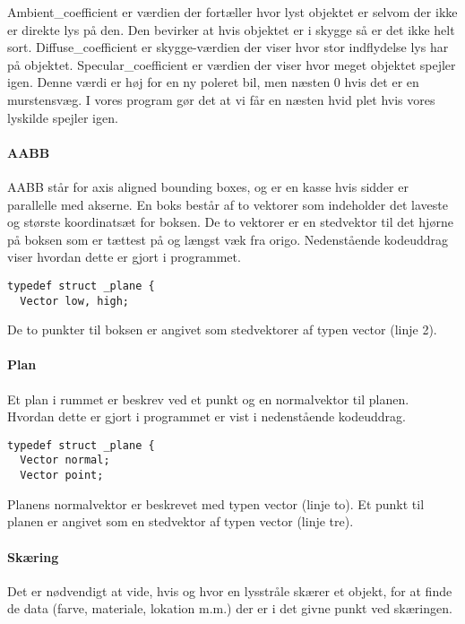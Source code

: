 Ambient\_coefficient er værdien der fortæller hvor lyst objektet er selvom der ikke er direkte lys på den. Den bevirker at hvis objektet er i skygge så er det ikke helt sort.
Diffuse\_coefficient er skygge-værdien der viser hvor stor indflydelse lys har på objektet. 
Specular\_coefficient er værdien der viser hvor meget objektet spejler igen. Denne værdi er høj for en ny poleret bil, men næsten 0 hvis det er en murstensvæg. I vores program gør det at vi får en næsten hvid plet hvis vores lyskilde spejler igen.

\paragraph{AABB}
AABB står for axis aligned bounding boxes, og er en kasse hvis sidder er parallelle med akserne. En boks består af to vektorer som indeholder det laveste og største koordinatsæt for boksen. De to vektorer er en stedvektor til det hjørne på boksen som er tættest på og længst væk fra origo. Nedenstående kodeuddrag viser hvordan dette er gjort i programmet.

\begin{lstlisting}[style=Cstyle, caption=Struct til bounding boxes]
typedef struct _plane {
  Vector low, high;
\end{lstlisting}

De to punkter til boksen er angivet som stedvektorer af typen vector (linje 2).

\paragraph{Plan}
Et plan i rummet er beskrev ved et punkt og en normalvektor til planen. Hvordan dette er gjort i programmet er vist i nedenstående kodeuddrag. 

\begin{lstlisting}[style=Cstyle, caption=Struct til plan]
typedef struct _plane {
  Vector normal;
  Vector point;
\end{lstlisting}

Planens normalvektor er beskrevet med typen vector (linje to). Et punkt til planen er angivet som en stedvektor af typen vector (linje tre).

\paragraph{Skæring}
Det er nødvendigt at vide, hvis og hvor en lysstråle skærer et objekt, for at finde de data (farve, materiale, lokation m.m.) der er i det givne punkt ved skæringen.

